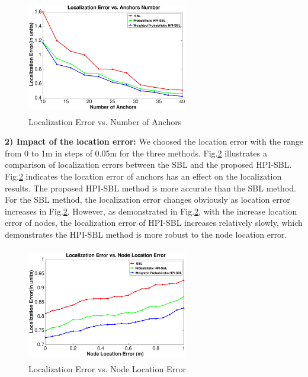  \begin{figure}[htb]
            \setlength{\abovecaptionskip}{0pt}
            \centering
			 \vspace{-2mm}
           		 \includegraphics[height=5.0cm,width=7.0cm]{image/nodenumber.eps}
            \caption{Localization Error vs. Number of Anchors}
             \vspace{-5mm}
             \label{fig4}
        \end{figure}

		
\textbf{2) Impact of the location error:}
 We choosed the location error with the range from 0 to 1m in steps of 0.05m for the three methods. 
Fig.\ref{fig5} illustrates a comparison of localization errors between the  SBL and the proposed HPI-SBL.
 Fig.\ref{fig5} indicates the location error of anchors has an effect on the localization results. 
 The proposed HPI-SBL method is more accurate than the SBL method. 
 For the SBL method, the localization error changes obviously as location error increases in Fig.\ref{fig5}. 
 However, as demonstrated in Fig.\ref{fig5}, with the increase location error of nodes, the localization error of HPI-SBL increases relatively slowly, which demonstrates the HPI-SBL method is more robust to the node location error.


  \begin{figure}[htb]
            \centering
		   \vspace{-2mm}
			 \includegraphics[height=5.0cm,width=7.0cm]{image/location.eps}
            \caption{Localization Error vs. Node Location Error}
             \vspace{-5mm}
             \label{fig5}
        \end{figure}
	

